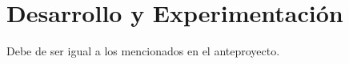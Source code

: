 \chapter{Desarrollo y Experimentación}
\label{ch:experimentacion}

Debe de ser igual a los mencionados en el anteproyecto.